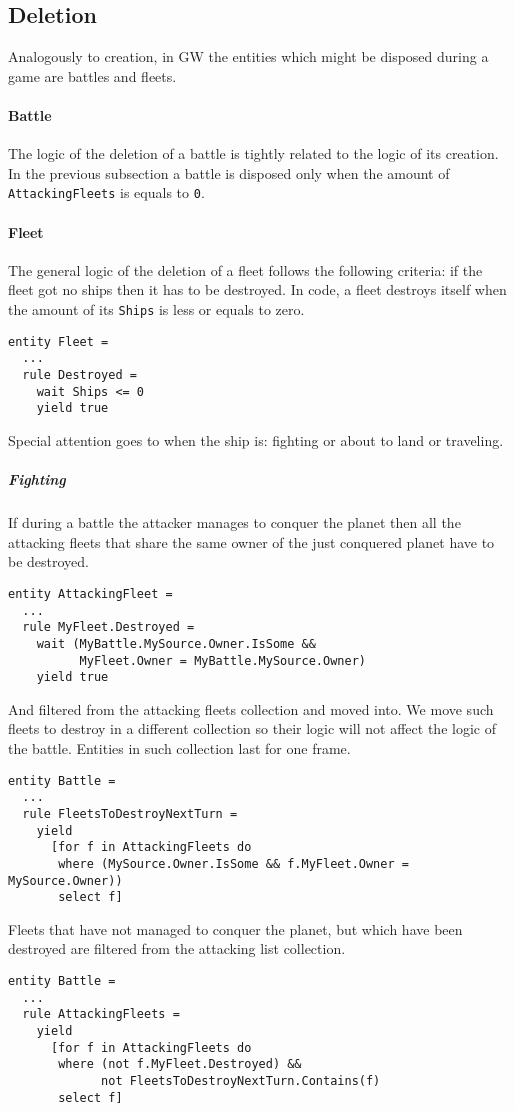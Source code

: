 \subsection{Deletion}
\noindent
Analogously to creation, in GW the entities which might be disposed during a game are battles and fleets. 


\paragraph{Battle}
The logic of the deletion of a battle is tightly related to the logic of its creation. In the previous subsection a battle is disposed only when the amount of \texttt{AttackingFleets} is equals to \texttt{0}.

\paragraph{Fleet}
The general logic of the deletion of a fleet follows the following criteria: if the fleet got no ships then it has to be destroyed. In code, a fleet destroys itself when the amount of its \texttt{Ships} is less or equals to zero.
\begin{lstlisting}
entity Fleet =
  ...
  rule Destroyed = 
    wait Ships <= 0
    yield true
\end{lstlisting}

\noindent
Special attention goes to when the ship is: fighting or about to land or traveling.

\subparagraph{Fighting} If during a battle the attacker manages to conquer the planet then all the attacking fleets that share the same owner of the just conquered planet have to be destroyed. 
\begin{lstlisting}
entity AttackingFleet =
  ...
  rule MyFleet.Destroyed =
    wait (MyBattle.MySource.Owner.IsSome && 
          MyFleet.Owner = MyBattle.MySource.Owner)
    yield true
\end{lstlisting}
And filtered from the attacking fleets collection and moved into. We move such fleets to destroy in a different collection so their logic will not affect the logic of the battle. Entities in such collection last for one frame.
\begin{lstlisting}
entity Battle =
  ...
  rule FleetsToDestroyNextTurn =
    yield
      [for f in AttackingFleets do       
       where (MySource.Owner.IsSome && f.MyFleet.Owner = MySource.Owner))
       select f]
\end{lstlisting}
Fleets that have not managed to conquer the planet, but which have been destroyed are filtered from the attacking list collection.
\begin{lstlisting}
entity Battle =
  ...
  rule AttackingFleets =
    yield 
      [for f in AttackingFleets do       
       where (not f.MyFleet.Destroyed) &&
             not FleetsToDestroyNextTurn.Contains(f)
       select f]
\end{lstlisting}


